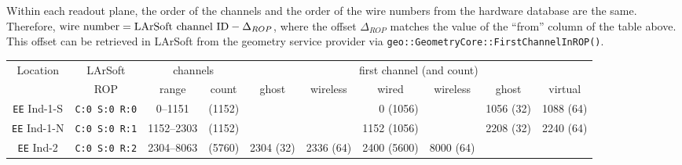 Within each readout plane, the order of the channels
and the order of the wire numbers from the hardware database are the same.
Therefore, $\textnormal{wire number} = \textnormal{LArSoft channel ID} - \Delta_{ROP}$,
where the offset $\Delta_{ROP}$ matches the value
of the ``from'' column of the table above.
This offset can be retrieved in LArSoft from the geometry service provider via
\texttt{geo::GeometryCore::FirstChannelInROP()}.


\begin{table}
  \begin{tabular}{|cc|cc|rrrrrr|}
    \hline
    \hline
    Location            & LArSoft              & \multicolumn{2}{c|}{channels} & \multicolumn{6}{c|}{first channel (and count)}                        \\
                        & ROP                  & \multicolumn{1}{c}{range}
                                                              & count  & \multicolumn{1}{c}{ghost}
                                                                                    & \multicolumn{1}{c}{wireless}
                                                                                                 & \multicolumn{1}{c}{wired}
                                                                                                                & \multicolumn{1}{c}{wireless}
                                                                                                                             & \multicolumn{1}{c}{ghost}
                                                                                                                                          & \multicolumn{1}{c|}{virtual}
                                                                                                                                                       \\
    \hline
    \texttt{EE} Ind-1-S & \texttt{C:0 S:0 R:0} &     0--1151  & (1152) &            &            &     0 (1056) &            &  1056 (32) &  1088 (64) \\
    \texttt{EE} Ind-1-N & \texttt{C:0 S:0 R:1} &  1152--2303  & (1152) &            &            &  1152 (1056) &            &  2208 (32) &  2240 (64) \\
    \texttt{EE} Ind-2   & \texttt{C:0 S:0 R:2} &  2304--8063  & (5760) &  2304 (32) &  2336 (64) &  2400 (5600) &  8000 (64) &            &            \\

\end{tabular}
\end{table}
